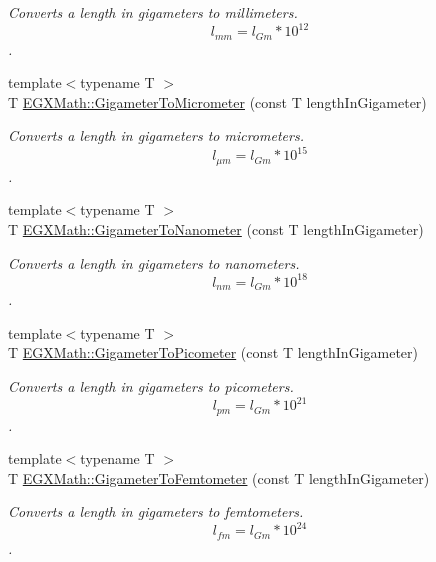 \begin{DoxyCompactItemize}
\begin{DoxyCompactList}\small\item\em Converts a length in gigameters to millimeters. \[ l_{mm}=l_{Gm} * 10^{12} \]. \end{DoxyCompactList}\item 
{\footnotesize template$<$typename T $>$ }\\T \mbox{\hyperlink{group___e_g_x_math-_conversions-_length_conversions-_s_i-_gigameter-_s_i_ga02f73d15581b1cd69a79b843186211f5}{E\+G\+X\+Math\+::\+Gigameter\+To\+Micrometer}} (const T length\+In\+Gigameter)
\begin{DoxyCompactList}\small\item\em Converts a length in gigameters to micrometers. \[ l_{\mu m}=l_{Gm} * 10^{15} \]. \end{DoxyCompactList}\item 
{\footnotesize template$<$typename T $>$ }\\T \mbox{\hyperlink{group___e_g_x_math-_conversions-_length_conversions-_s_i-_gigameter-_s_i_ga6538a7007f104833aa7ad690156342b5}{E\+G\+X\+Math\+::\+Gigameter\+To\+Nanometer}} (const T length\+In\+Gigameter)
\begin{DoxyCompactList}\small\item\em Converts a length in gigameters to nanometers. \[ l_{nm}=l_{Gm} * 10^{18} \]. \end{DoxyCompactList}\item 
{\footnotesize template$<$typename T $>$ }\\T \mbox{\hyperlink{group___e_g_x_math-_conversions-_length_conversions-_s_i-_gigameter-_s_i_gae9cea35a0ce747d02ec8b6cf7bfeaa7e}{E\+G\+X\+Math\+::\+Gigameter\+To\+Picometer}} (const T length\+In\+Gigameter)
\begin{DoxyCompactList}\small\item\em Converts a length in gigameters to picometers. \[ l_{pm}=l_{Gm} * 10^{21} \]. \end{DoxyCompactList}\item 
{\footnotesize template$<$typename T $>$ }\\T \mbox{\hyperlink{group___e_g_x_math-_conversions-_length_conversions-_s_i-_gigameter-_s_i_ga6701fe7aa809ca67fef5d4f9bf7b241c}{E\+G\+X\+Math\+::\+Gigameter\+To\+Femtometer}} (const T length\+In\+Gigameter)
\begin{DoxyCompactList}\small\item\em Converts a length in gigameters to femtometers. \[ l_{fm}=l_{Gm} * 10^{24} \]. \end{DoxyCompactList}\item 

\end{DoxyCompactItemize}
